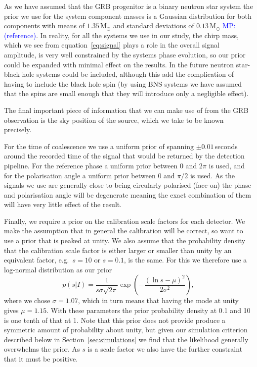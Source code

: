 \documentclass[10pt]{iopart}
\newcommand{\MP}[1]{\textcolor{blue}{MP: #1}}
\begin{document}
As we have assumed that the GRB progenitor is a binary neutron star system the prior we use for the 
system component masses is a Gaussian distribution for both components with means 
of $1.35\,\textrm{M}_{\odot}$ and standard deviations of $0.13\,\textrm{M}_{\odot}$ 
\MP{(reference)}. In reality, for all the systems we use in our study, the chirp mass, which 
we see from equation~\ref{eq:signal} plays a role in the overall signal amplitude, is very well 
constrained by the systems phase evolution, so our prior could be expanded with minimal effect on 
the results. In the future neutron star-black hole systems could be included, although this add the 
complication of having to include the black hole spin (by using BNS systems we have assumed that 
the spins are small enough that they will introduce only a negligible effect).

The final important piece of information that we can make use of from the GRB observation is the 
sky position of the source, which we take to be known precisely.

For the time of coalescence we use a uniform prior of spanning $\pm0.01$\,seconds around the 
recorded time of the signal that would be returned by the detection pipeline. For the reference 
phase a uniform prior between 0 and $2\pi$ is used, and for the polarisation angle a uniform prior 
between 0 and $\pi/2$ is used. As the signals we use are generally close to being circularly 
polarised (face-on) the phase and polarisation angle will be degenerate meaning the exact 
combination of them will have very little effect of the result.

Finally, we require a prior on the calibration scale factors for each detector. We make the 
assumption that in general the calibration will be correct, so want to use a prior that is peaked 
at unity. We also assume that the probability density that the calibration scale factor is either 
larger or smaller than unity by an equivalent factor, e.g.\ $s=10$ or $s=0.1$, is the same. For this 
we therefore use a log-normal distribution as our prior
\begin{equation}
 p(s|I) = \frac{1}{s\sigma\sqrt{2\pi}}\exp{\left( -\frac{(\ln{s} - \mu)^2}{2\sigma^2} \right)},
\end{equation}
where we chose $\sigma = 1.07$, which in turn means that having the mode at unity gives $\mu = 
1.15$. With these parameters the prior probability density at 0.1 and 10 is one tenth of that at 
1. Note that this prior does not provide produce a symmetric amount of probability about unity, but 
given our simulation criterion described below in Section~\ref{sec:simulations} we find that the 
likelihood generally overwhelms the prior. As $s$ is a scale factor we also have the further 
constraint that it must be positive.
\end{document}
